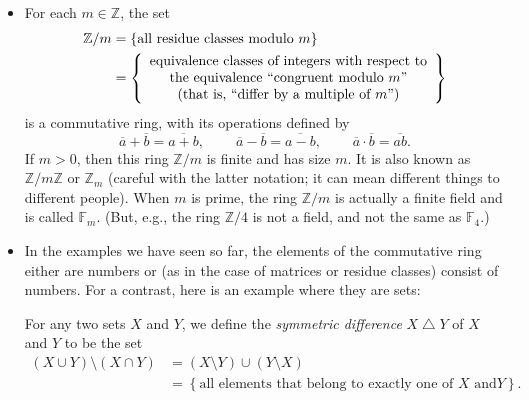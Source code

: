 \begin{itemize}
\item For each $m\in\mathbb{Z}$, the set
\begin{align*}
\mathbb{Z}/m  &  =\left\{  \text{all residue classes modulo }m\right\} \\
&  =\left\{
\begin{array}
[c]{c}%
\text{equivalence classes of integers with respect to}\\
\text{the equivalence \textquotedblleft congruent modulo }%
m\text{\textquotedblright}\\
\text{(that is, \textquotedblleft differ by a multiple of }%
m\text{\textquotedblright)}%
\end{array}
\right\}
\end{align*}
is a commutative ring, with its operations defined by%
\[
\overline{a}+\overline{b}=\overline{a+b},\ \ \ \ \ \ \ \ \ \ \overline
{a}-\overline{b}=\overline{a-b},\ \ \ \ \ \ \ \ \ \ \overline{a}\cdot
\overline{b}=\overline{ab}.
\]
If $m>0$, then this ring $\mathbb{Z}/m$ is finite and has size $m$. It is also
known as $\mathbb{Z}/m\mathbb{Z}$ or $\mathbb{Z}_{m}$ (careful with the latter
notation; it can mean different things to different people). When $m$ is
prime, the ring $\mathbb{Z}/m$ is actually a finite field and is called
$\mathbb{F}_{m}$. (But, e.g., the ring $\mathbb{Z}/4$ is not a field, and not
the same as $\mathbb{F}_{4}$.)

\item In the examples we have seen so far, the elements of the commutative
ring either are numbers or (as in the case of matrices or residue classes)
consist of numbers. For a contrast, here is an example where they are sets:

For any two sets $X$ and $Y$, we define the \emph{symmetric difference}
$X\bigtriangleup Y$ of $X$ and $Y$ to be the set%
\begin{align*}
\left(  X\cup Y\right)  \setminus\left(  X\cap Y\right)   &  =\left(
X\setminus Y\right)  \cup\left(  Y\setminus X\right) \\
&  =\left\{  \text{all elements that belong to exactly one of }X\text{ and
}Y\right\}  .
\end{align*}



\end{itemize}
